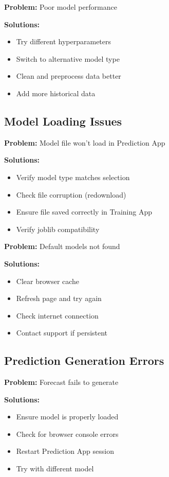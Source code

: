 \textbf{Problem:} Poor model performance

\textbf{Solutions:}
\begin{itemize}
	\item Try different hyperparameters
	\item Switch to alternative model type
	\item Clean and preprocess data better
	\item Add more historical data
\end{itemize}

\subsection{Model Loading Issues}

\textbf{Problem:} Model file won't load in Prediction App

\textbf{Solutions:}
\begin{itemize}
	\item Verify model type matches selection
	\item Check file corruption (redownload)
	\item Ensure file saved correctly in Training App
	\item Verify joblib compatibility
\end{itemize}

\textbf{Problem:} Default models not found

\textbf{Solutions:}
\begin{itemize}
	\item Clear browser cache
	\item Refresh page and try again
	\item Check internet connection
	\item Contact support if persistent
\end{itemize}

\subsection{Prediction Generation Errors}

\textbf{Problem:} Forecast fails to generate

\textbf{Solutions:}
\begin{itemize}
	\item Ensure model is properly loaded
	\item Check for browser console errors
	\item Restart Prediction App session
	\item Try with different model
\end{itemize}

